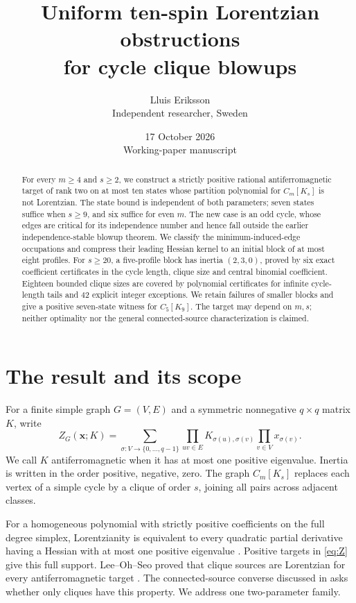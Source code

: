 \documentclass[11pt]{article}
\title{Uniform ten-spin Lorentzian obstructions\\for cycle clique blowups}
\author{Lluis Eriksson\\\small Independent researcher, Sweden}
\date{17 October 2026\\\small Working-paper manuscript}
\theoremstyle{remark}\newtheorem{remark}[theorem]{Remark}
\begin{document}
\maketitle
\begin{abstract}
For every $m\ge4$ and $s\ge2$, we construct a strictly positive
rational antiferromagnetic target of rank two on at most ten states
whose partition polynomial for $C_m[K_s]$ is not Lorentzian.
The state bound is independent of both parameters; seven states
suffice when $s\ge9$, and six suffice for even $m$.
The new case is an odd cycle, whose edges are critical for its
independence number and hence fall outside the earlier
independence-stable blowup theorem.
We classify the minimum-induced-edge occupations and compress
their leading Hessian kernel to an initial block of at most eight
profiles. For $s\ge20$, a five-profile block has inertia $(2,3,0)$,
proved by six exact coefficient certificates in the cycle length,
clique size and central binomial coefficient. Eighteen bounded
clique sizes are covered by polynomial certificates for infinite
cycle-length tails and 42 explicit integer exceptions.
We retain failures of smaller blocks and give a positive seven-state
witness for $C_5[K_9]$. The target may depend on $m,s$; neither
optimality nor the general connected-source characterization is claimed.
\end{abstract}

\section{The result and its scope}
For a finite simple graph $G=(V,E)$ and a symmetric nonnegative
$q\times q$ matrix $K$, write
\begin{equation}
 Z_G(\mathbf x;K)=
 \sum_{\sigma:V\to\{0,\ldots,q-1\}}
 \prod_{uv\in E}K_{\sigma(u),\sigma(v)}
 \prod_{v\in V}x_{\sigma(v)}.                         \label{eq:Z}
\end{equation}
We call $K$ antiferromagnetic when it has at most one positive
eigenvalue. Inertia is written in the order positive, negative, zero.
The graph $C_m[K_s]$ replaces each vertex of a simple cycle by a
clique of order $s$, joining all pairs across adjacent classes.

For a homogeneous polynomial with strictly positive coefficients
on the full degree simplex, Lorentzianity is equivalent to every
quadratic partial derivative having a Hessian with at most one
positive eigenvalue \cite[Theorem 2.25]{BH}. Positive targets in
\eqref{eq:Z} give this full support. Lee--Oh--Seo proved that clique
sources are Lorentzian for every antiferromagnetic target
\cite[Theorem 3.1]{LOS}. The connected-source converse discussed
in \cite[Section 6]{LS} asks whether only cliques have this property.
We address one two-parameter family.
\end{document}
